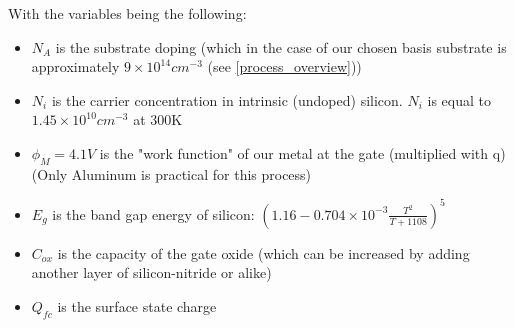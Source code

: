 With the variables being the following:
\begin{itemize}
\item $N_A$ is the substrate doping (which in the case of our chosen basis substrate is approximately $9\times10^{14}cm^{-3}$ (see \autoref{process_overview}))
\item $N_i$ is the carrier concentration in intrinsic (undoped) silicon. $N_i$ is equal to $1.45 \times 10^{10} cm^{-3}$ at 300\degree K
\item $\phi_M = 4.1 V$ is the "work function" of our metal at the gate (multiplied with q) (Only Aluminum is practical for this process)
\item $E_g$ is the band gap energy of silicon: $\left(1.16-0.704 \times 10^{-3} \frac{T^2}{T+1108} \right)^5$
\item $C_{ox}$ is the capacity of the gate oxide (which can be increased by adding another layer of silicon-nitride or alike)
\item $Q_{fc}$ is the surface state charge
\end{itemize}

